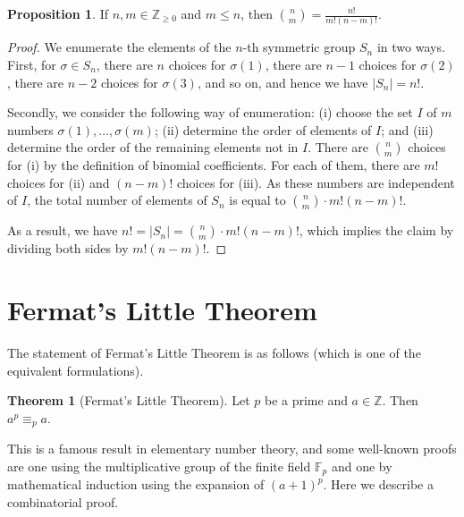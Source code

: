 ﻿\documentclass{article}
\theoremstyle{definition}
\newtheorem{proposition}{Proposition}
\newtheorem{theorem}{Theorem}
\begin{document}
\begin{proposition}
    \label{prop:binomial_coefficient_def}
    If $n,m \in \mathbb{Z}_{\geq 0}$ and $m \leq n$, then $\displaystyle \binom{n}{m} = \frac{ n! }{ m! (n-m)! }$.
\end{proposition}
\begin{proof}
    We enumerate the elements of the $n$-th symmetric group $S_n$ in two ways.
    First, for $\sigma \in S_n$, there are $n$ choices for $\sigma(1)$, there are $n-1$ choices for $\sigma(2)$, there are $n-2$ choices for $\sigma(3)$, and so on, and hence we have $|S_n| = n!$.

    Secondly, we consider the following way of enumeration: (i) choose the set $I$ of $m$ numbers $\sigma(1),\dots,\sigma(m)$; (ii) determine the order of elements of $I$; and (iii) determine the order of the remaining elements not in $I$.
    There are $\binom{n}{m}$ choices for (i) by the definition of binomial coefficients.
    For each of them, there are $m!$ choices for (ii) and $(n-m)!$ choices for (iii).
    As these numbers are independent of $I$, the total number of elements of $S_n$ is equal to $\binom{n}{m} \cdot m! (n-m)!$.

    As a result, we have $n! = |S_n| = \binom{n}{m} \cdot m! (n-m)!$, which implies the claim by dividing both sides by $m! (n-m)!$.
\end{proof}


\section{Fermat's Little Theorem}
\label{sec:Fermat's_Little_Theorem}

The statement of Fermat's Little Theorem is as follows (which is one of the equivalent formulations).

\begin{theorem}
    [Fermat's Little Theorem]
    \label{thm:Fermat's_Little_Theorem}
    Let $p$ be a prime and $a \in \mathbb{Z}$.
    Then $a^p \equiv_p a$.
\end{theorem}

This is a famous result in elementary number theory, and some well-known proofs are one using the multiplicative group of the finite field $\mathbb{F}_p$ and one by mathematical induction using the expansion of $(a+1)^p$.
Here we describe a combinatorial proof.
\end{document}
